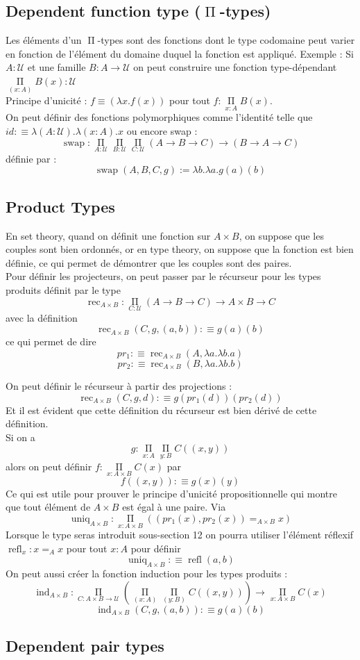 \documentclass[a4paper,12pt]{report}
\newcommand{\paren}[1]{\left(#1\right)}
\let\oldPi\Pi
\renewcommand{\Pi}{\mathop{\oldPi}\limits}
\newcommand{\fct}[1]{\operatorname{#1}}
\renewcommand{\cal}[1]{\mathcal{#1}}
\renewcommand{\to}{\longrightarrow}
\begin{document}
\subsection{Dependent function type (\(\Pi\)-types)}

Les éléments d'un \(\Pi\)-types sont des fonctions dont le type codomaine peut varier en fonction de l'élément du domaine duquel la fonction est appliqué. Exemple : Si \(A:\cal{U}\) et une famille \(B : A \to \cal{U}\) on peut construire une fonction type-dépendant \(\Pi_{\paren{x:A}} B(x) : \cal{U}\) \\
Principe d'unicité : \(f \equiv \paren{\lambda x.f(x)}\) pour tout \(f : \Pi_{x:A}B(x)\). \\
On peut définir des fonctions polymorphiques comme l'identité telle que \(id : \equiv \lambda\paren{A : \cal{U}}.\lambda \paren{x : A}.x\) ou encore swap : \[\fct{swap} : \Pi_{A:\cal{U}}\Pi_{B:\cal{U}}\Pi_{C:\cal{U}} \paren{A \to B \to C} \to \paren{B \to A \to C}\] définie par :\[\fct{swap}(A,B,C,g):= \lambda b . \lambda a.g(a)(b)\] 
\subsection{Product Types}
En set theory, quand on définit une fonction sur \(A \times B\), on suppose que les couples sont bien ordonnés, or en type theory, on suppose que la fonction est bien définie, ce qui permet de démontrer que les couples sont des paires.\\
Pour définir les projecteurs, on peut passer par le récurseur pour les types produits définit par le type \[\fct{rec}_{A \times B} : \Pi_{C :\cal{U}}\paren{A \to B \to C} \to A \times B \to C\] avec la définition \[\fct{rec}_{A \times B} \paren{C,g,(a,b)}: \equiv g(a)(b)\] ce qui permet de dire \[pr_1 : \equiv \fct{rec}_{A\times B}(A,\lambda a.\lambda b.a)\]
\[pr_2 : \equiv \fct{rec}_{A \times B} (B,\lambda a. \lambda b.b)\]

On peut définir le récurseur à partir des projections :
\[\fct{rec}_{A\times B} (C,g,d) : \equiv g(pr_1(d))(pr_2(d))\]
Et il est évident que cette définition du récurseur est bien dérivé de cette définition. \\
Si on a \[g : \Pi_{x:A}\Pi_{y:B}C((x,y))\] alors on peut définir \(f : \Pi_{x:A \times B} C(x)\) par \[f((x,y)): \equiv g(x)(y)\]
Ce qui est utile pour prouver le principe d'unicité propositionnelle qui montre que tout élément de \(A \times B\) est égal à une paire.
Via \[\fct{uniq}_{A \times B} : \Pi_{x : A \times B} \paren{\paren{pr_1 (x),pr_2(x)} =_{A \times B} x}\]
Lorsque le type seras introduit sous-section 12 on pourra utiliser l'élément réflexif \(\fct{refl}_x : x =_{A} x\) pour tout \(x:A\) pour définir \[\fct{uniq}_{A \times B}: \equiv \fct{refl}{(a,b)}\]
On peut aussi créer la fonction induction pour les types produits : \[\fct{ind}_{A \times B}  : \Pi_{C:A \times B \to \cal{U}}\paren{\Pi_{\paren{x:A}}\Pi_{\paren{y:B}}C((x,y))}\to\Pi_{x:A\times B}C(x)\]
\[\fct{ind}_{A \times B} \paren{C,g,(a,b)}:\equiv g(a)(b)\]
\subsection{Dependent pair types}
\end{document}
